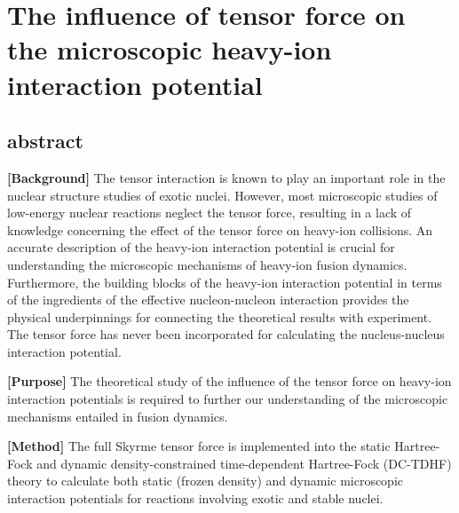 
\chapter{The influence of tensor force on the microscopic heavy-ion interaction potential}\label{chapters:chapter_4}
\vspace{-7mm}

\author{Lu Guo}
\author{K. Godbey}
\author{A. S. Umar}



\section*{abstract}

		{\bf [Background]}
		The tensor interaction is known to play an important role in the nuclear structure studies of exotic nuclei.
		However, most microscopic studies of low-energy nuclear reactions
		neglect the tensor force, resulting in a lack of knowledge concerning the effect of the tensor force on heavy-ion collisions.
		An accurate description of the heavy-ion interaction
		potential is crucial for understanding the microscopic mechanisms of heavy-ion fusion dynamics.
		Furthermore, the building blocks of the heavy-ion interaction potential in terms of the ingredients of the
		effective nucleon-nucleon interaction provides the physical underpinnings for connecting the theoretical
		results with experiment.
		The tensor force has never been
		incorporated for calculating the nucleus-nucleus interaction potential.
		
		{\bf [Purpose]}
		The theoretical study of the influence of the tensor force on heavy-ion interaction potentials is required to further our
		understanding of the microscopic mechanisms entailed in fusion dynamics.
		
		{\bf [Method]}
The full Skyrme tensor force is implemented into the static Hartree-Fock and dynamic density-constrained time-dependent Hartree-Fock
(DC-TDHF) theory
to calculate both static (frozen density) and dynamic microscopic interaction potentials for reactions involving exotic and stable nuclei.
		
